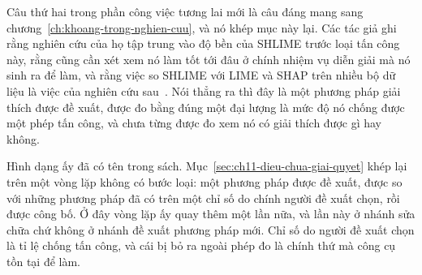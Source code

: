 %
Câu thứ hai trong phần công việc tương lai mới là câu đáng mang sang
chương~\ref{ch:khoang-trong-nghien-cuu}, và nó khép mục này lại. Các tác giả
ghi rằng nghiên cứu của họ tập trung vào độ bền của SHLIME trước loại tấn công
này, rằng cũng cần xét xem nó làm tốt tới đâu ở chính nhiệm vụ diễn giải mà nó
sinh ra để làm, và rằng việc so SHLIME với LIME và SHAP trên nhiều bộ dữ liệu
là việc của nghiên cứu sau~\autocite{p27shlime}. Nói thẳng ra thì đây là một
phương pháp giải thích được đề xuất, được đo bằng đúng một đại lượng là mức độ
nó chống được một phép tấn công, và chưa từng được đo xem nó có giải thích được
gì hay không.

Hình dạng ấy đã có tên trong sách. Mục~\ref{sec:ch11-dieu-chua-giai-quyet} khép
lại trên một vòng lặp không có bước loại: một phương pháp được đề xuất, được so
với những phương pháp đã có trên một chỉ số do chính người đề xuất chọn, rồi
được công bố. Ở đây vòng lặp ấy quay thêm một lần nữa, và lần này ở nhánh sửa
chữa chứ không ở nhánh đề xuất phương pháp mới. Chỉ số do người đề xuất chọn là
tỉ lệ chống tấn công, và cái bị bỏ ra ngoài phép đo là chính thứ mà công cụ tồn
tại để làm.

%
